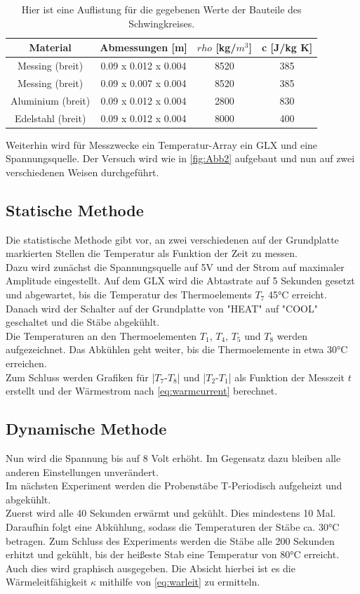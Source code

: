 \begin{table}
    \centering
    \caption{Hier ist eine Auflistung für die gegebenen Werte der Bauteile des Schwingkreises.}
    \label{tab:werte2}
    \begin{tabular}{c c c c}
        \toprule
        Material & Abmessungen [m] & \(rho\) [kg/$m^3$] & c [J/kg K] \\
        \midrule
            Messing (breit) & 0.09 x 0.012 x 0.004 & 8520 & 385 \\
            Messing (breit) & 0.09 x 0.007 x 0.004 & 8520 & 385 \\
            Aluminium (breit) & 0.09 x 0.012 x 0.004 & 2800 & 830 \\
            Edelstahl (breit) & 0.09 x 0.012 x 0.004 & 8000 & 400 \\
    \end{tabular}
  \end{table}

Weiterhin wird für Messzwecke ein Temperatur-Array ein GLX und eine Spannungsquelle. Der Versuch wird wie in \autoref{fig:Abb2} aufgebaut und nun auf zwei verschiedenen Weisen durchgeführt.

\subsection{Statische Methode}
  Die statistische Methode gibt vor, an zwei verschiedenen auf der Grundplatte markierten Stellen die Temperatur als Funktion der Zeit zu messen.\\
  Dazu wird zunächst die Spannungsquelle auf 5V und der Strom auf maximaler Amplitude eingestellt. Auf dem GLX wird die Abtastrate auf 5 Sekunden gesetzt und abgewartet, bis die Temperatur des Thermoelements \(T_7\) 45°C erreicht. Danach wird der Schalter auf der Grundplatte von "HEAT" auf "COOL" geschaltet und die Stäbe abgekühlt.\\
  Die Temperaturen an den Thermoelementen \(T_1\), \(T_4\), \(T_5\) und \(T_8\) werden aufgezeichnet. Das Abkühlen geht weiter, bis die Thermoelemente in etwa 30°C erreichen.\\
  Zum Schluss werden Grafiken für |\(T_7\)-\(T_8\)| und |\(T_2\)-\(T_1\)| als Funktion der Messzeit \(t\) erstellt und der Wärmestrom nach \autoref{eq:warmcurrent} berechnet.
  
\subsection{Dynamische Methode}
  Nun wird die Spannung bis auf 8 Volt erhöht. Im Gegensatz dazu bleiben alle anderen Einstellungen unverändert.\\
  Im nächsten Experiment werden die Probenstäbe T-Periodisch aufgeheizt und abgekühlt.\\
  Zuerst wird alle 40 Sekunden erwärmt und gekühlt. Dies mindestens 10 Mal. Daraufhin folgt eine Abkühlung, sodass die Temperaturen der Stäbe ca. 30°C betragen. Zum Schluss des Experiments werden die Stäbe alle 200 Sekunden erhitzt und gekühlt, bis der heißeste Stab eine Temperatur von 80°C erreicht. Auch dies wird graphisch ausgegeben. Die Absicht hierbei ist es die Wärmeleitfähigkeit \(\kappa\) mithilfe von \autoref{eq:warleit} zu ermitteln.